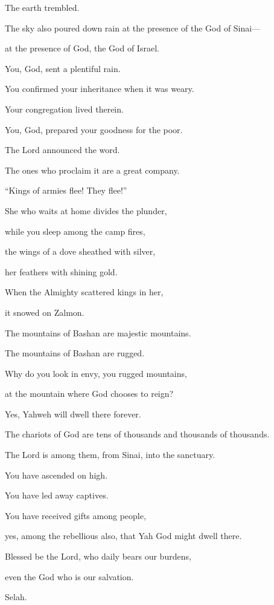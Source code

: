 {\Q {}The earth trembled.
\par }{\QB The sky also poured down rain at the presence of the God of Sinai—
\par }{\QB at the presence of God, the God of Israel.
\par }{\Q {}You, God, sent a plentiful rain.
\par }{\QB You confirmed your inheritance when it was weary.
\par }{\Q {}Your congregation lived therein.
\par }{\QB You, God, prepared your goodness for the poor.
\par }{\Q {}The Lord announced the word.
\par }{\QB The ones who proclaim it are a great company.
\par }{\Q {}“Kings of armies flee! They flee!”
\par }{\QB She who waits at home divides the plunder,
\par }{\QB {}while you sleep among the camp fires,
\par }{\QB the wings of a dove sheathed with silver,
\par }{\QB her feathers with shining gold.
\par }{\Q {}When the Almighty scattered kings in her,
\par }{\QB it snowed on Zalmon.
\par }{\Q {}The mountains of Bashan are majestic mountains.
\par }{\QB The mountains of Bashan are rugged.
\par }{\Q {}Why do you look in envy, you rugged mountains,
\par }{\QB at the mountain where God chooses to reign?
\par }{\QB Yes, Yahweh will dwell there forever.
\par }{\Q {}The chariots of God are tens of thousands and thousands of thousands.
\par }{\QB The Lord is among them, from Sinai, into the sanctuary.
\par }{\Q {}You have ascended on high.
\par }{\QB You have led away captives.
\par }{\Q You have received gifts among people,
\par }{\QB yes, among the rebellious also, that Yah God might dwell there.
\par }{\BB \par }{\Q {}Blessed be the Lord, who daily bears our burdens,
\par }{\QB even the God who is our salvation.
\par }{\QS Selah.\par }
